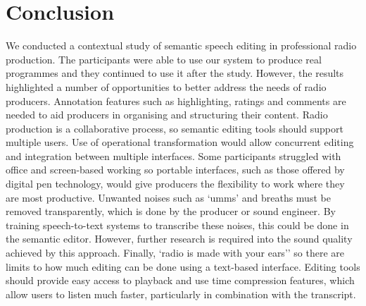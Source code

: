 \section{Conclusion}\label{sec:conclusion}
We conducted a contextual study of semantic speech editing in professional radio production. The participants were able
to use our system to produce real programmes and they continued to use it after the study.  However, the results
highlighted a number of opportunities to better address the needs of radio producers.
Annotation features such as highlighting, ratings and comments are needed to aid producers in organising and
structuring their content.
Radio production is a collaborative process, so semantic editing tools should support multiple users. Use of
operational transformation would allow concurrent editing and integration between multiple interfaces.
Some participants struggled with office and screen-based working so portable interfaces, such as those offered by
digital pen technology, would give producers the flexibility to work where they are most productive. 
Unwanted noises such as `umms' and breaths must be removed transparently, which is done by the producer or sound
engineer. By training speech-to-text systems to transcribe these noises, this could be done in the semantic editor.
However, further research is required into the sound quality achieved by this approach.
Finally, `radio is made with your ears'' so there are limits to how much editing can be done using a text-based
interface. Editing tools should provide easy access to playback and use time compression features, which allow users to
listen much faster, particularly in combination with the transcript.


